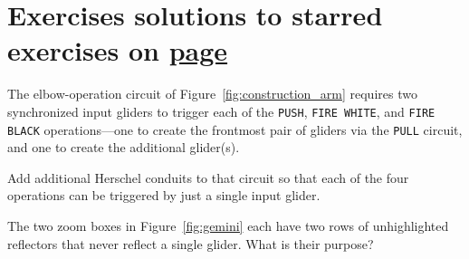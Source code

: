 \section*{Exercises \hfill \normalfont\textsf{\small solutions to starred exercises on \hyperlink{solutions_universal_construction}{page \pageref{solutions_universal_construction}}}}
\label{sec:universal_construction_exercises}
\vspace*{-0.4cm}\hrulefill\vspace*{-0.3cm}\footnotesize\begin{multicols}{2}\vspace*{-0.4cm}\raggedcolumns{}
\setlength{\parskip}{0pt}


\begin{problem}\label{exer:construction_arm_lanes_timed}
	The elbow-operation circuit of Figure~\ref{fig:construction_arm} requires two synchronized input gliders to trigger each of the \texttt{PUSH}, \texttt{FIRE WHITE}, and \texttt{FIRE BLACK} operations---one to create the frontmost pair of gliders via the \texttt{PULL} circuit, and one to create the additional glider(s).
	
	Add additional Herschel conduits to that circuit so that each of the four operations can be triggered by just a single input glider.
\end{problem}


\mfilbreak


\begin{problemstar}\label{exer:gemini_unhighlighted_reflectors}
	The two zoom boxes in Figure~\ref{fig:gemini} each have two rows of unhighlighted reflectors that never reflect a single glider. What is their purpose?
\end{problemstar}


\end{multicols}
\normalsize\vspace*{0.01cm}
